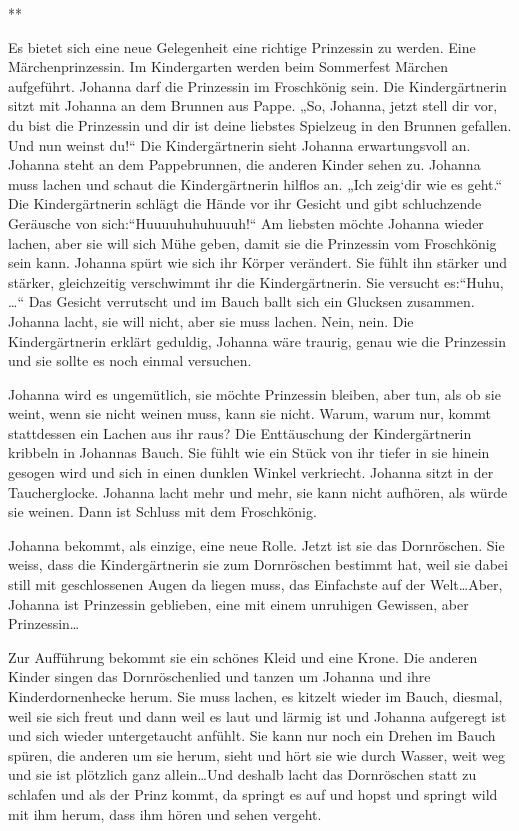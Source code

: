 \documentclass[10pt,titlepage,a5paper]{book}
\newcommand{\sterne}{\par{\centering ***\par}}
\begin{document}
\sterne


Es bietet sich eine neue Gelegenheit eine richtige Prinzessin zu werden. Eine Märchenprinzessin. Im Kindergarten werden beim Sommerfest Märchen aufgeführt. Johanna darf die Prinzessin im Frosch\-könig sein. Die Kindergärtnerin sitzt mit Johanna an dem Brunnen aus Pappe. „So, Johanna, jetzt stell dir vor, du bist die Prinzessin und dir ist deine liebstes Spielzeug in den Brunnen gefallen. Und nun weinst du!“ Die Kindergärtnerin sieht Johanna erwartungsvoll an. Johanna steht an dem Pappebrunnen, die anderen Kinder sehen zu. Johanna muss lachen und schaut die Kindergärtnerin hilflos an. „Ich zeig`dir wie es geht.“ Die Kinder\-gärt\-nerin schlägt die Hände vor ihr Gesicht und gibt schluchzende Geräusche von sich:“Huuuuhuhuhuuuh!“ Am liebsten möchte Johanna wieder lachen, aber sie will sich Mühe geben, damit sie die Prinzessin vom Froschkönig sein kann. Johanna spürt wie sich ihr Körper verändert. Sie fühlt ihn stärker und stärker, gleichzeitig verschwimmt ihr die Kindergärtnerin. Sie versucht es:“Huhu, \dots“ Das Gesicht verrutscht und im Bauch ballt sich ein Glucksen zusammen. Johanna lacht, sie will nicht, aber sie muss lachen.
Nein, nein. Die Kindergärtnerin erklärt geduldig, Johanna wäre traurig, genau wie die Prinzessin und sie sollte es noch einmal versuchen.

Johanna wird es ungemütlich, sie möchte Prinzessin bleiben, aber tun, als ob sie weint, wenn sie nicht weinen muss, kann sie nicht. Warum, warum nur, kommt stattdessen ein Lachen aus ihr raus? Die Enttäuschung der Kindergärtnerin kribbeln in Johannas Bauch. Sie fühlt wie ein Stück von ihr tiefer  in sie hinein gesogen wird und sich in einen dunklen Winkel verkriecht. Johanna sitzt in der Taucherglocke. Johanna lacht mehr und mehr, sie kann nicht aufhören, als würde sie weinen. Dann ist Schluss mit dem Froschkönig. 

Johanna bekommt, als einzige, eine neue Rolle. Jetzt ist sie das Dornröschen. Sie weiss, dass die Kindergärtnerin sie zum Dornrös\-chen bestimmt hat, weil sie dabei still mit geschlossenen Augen da liegen muss, das Einfachste auf der Welt\dots Aber, Johanna ist Prinzessin geblieben, eine mit einem unruhigen Gewissen, aber Prinzessin\dots

Zur Aufführung bekommt sie ein schönes Kleid und eine Krone. Die anderen Kinder singen das Dornröschenlied und tanzen um Johanna und ihre Kinderdornenhecke herum. Sie muss lachen, es kitzelt wieder im Bauch, diesmal, weil sie sich freut und dann weil es laut und lärmig ist und Johanna aufgeregt ist und sich wieder untergetaucht anfühlt. Sie kann nur noch ein Drehen im Bauch spüren, die anderen um sie herum, sieht und hört sie wie durch Wasser, weit weg und sie ist plötzlich ganz allein\dots Und deshalb lacht das Dornröschen statt zu schlafen und als der Prinz kommt, da springt es auf und hopst und springt wild mit ihm herum, dass ihm hören und sehen vergeht. 
\end{document}
